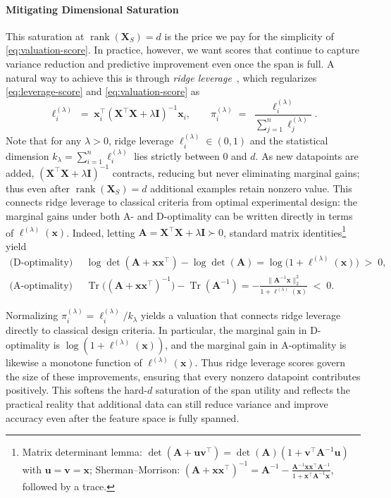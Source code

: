 \documentclass{article}
\def\amat{\mathbf{A}}
\def\xmat{\mathbf{X}}
\def\imat{\mathbf{I}}
\def\x{\mathbf{x}}
\def\uvec{\mathbf{u}}
\def\vvec{\mathbf{v}}
\newcommand{\1}{\mathbbm{1}}
\DeclareMathOperator{\Tr}{Tr}
\DeclareMathOperator{\rank}{rank}
\begin{document}
\paragraph{Mitigating Dimensional Saturation}

This saturation at $\rank(\xmat_S)=d$ is the price we pay for the simplicity of \eqref{eq:valuation-score}.
%
In practice, however, we want scores that continue to capture variance reduction and predictive improvement even once the span is full.
%
A natural way to achieve this is through \emph{ridge leverage}~\cite{cohen2015ridge}, which regularizes \eqref{eq:leverage-score} and \eqref{eq:valuation-score} as 
%
\begin{equation}
    \label{eq:ridge-leverage}
    \ell_i^{(\lambda)} \;=\; \x_i^\top (\xmat^\top \xmat + \lambda \imat)^{-1} \x_i,
    \qquad
    \pi_i^{(\lambda)} \;=\; \frac{\ell_i^{(\lambda)}}{\sum_{j=1}^n \ell_j^{(\lambda)}}.
\end{equation}
%
Note that for any $\lambda>0$, ridge leverage $\ell_i^{(\lambda)} \in (0,1)$ and the statistical dimension $k_\lambda=\sum_{i=1}^n \ell_i^{(\lambda)}$ lies strictly between $0$ and $d$.
%
As new datapoints are added, $(\xmat^\top \xmat+\lambda \imat)^{-1}$ contracts, reducing but never eliminating marginal gains; thus even after $\rank(\xmat_S)=d$ additional examples retain nonzero value.
%
This connects ridge leverage to classical criteria from optimal experimental design: the marginal gains under both A- and D-optimality can be written directly in terms of $\ell^{(\lambda)}(\x)$.
%
Indeed, letting $\amat=\xmat^\top \xmat+\lambda \imat \succ 0$, standard matrix identities\footnote{Matrix determinant lemma: $\det(\amat + \uvec \vvec^\top)=\det(\amat)(1+\vvec^\top \amat^{-1}\uvec)$ with $\uvec=\vvec=\x$; Sherman–Morrison: $(\amat+\x \x^\top)^{-1}=\amat^{-1}-\frac{\amat^{-1}\x\x^\top \amat^{-1}}{1+\x^\top \amat^{-1}\x}$, followed by a trace.} yield
\begin{align*}
    \text{(D-optimality)} \qquad & \log\det(\amat+\x \x^\top) - \log\det(\amat) = \log\!\big(1+\ell^{(\lambda)}(\x)\big) \;>\; 0,\\
    \text{(A-optimality)} \qquad & \Tr\!\big((\amat + \x\x^\top)^{-1}\big) - \Tr(\amat^{-1}) = -\frac{\|\amat^{-1}\x\|_2^2}{1+\ell^{(\lambda)}(\x)} \;<\; 0.
\end{align*}

Normalizing $\pi_i^{(\lambda)} = \ell_i^{(\lambda)}/k_\lambda$ yields a valuation that connects ridge leverage directly to classical design criteria.
%
In particular, the marginal gain in D-optimality is $\log(1+\ell^{(\lambda)}(\x))$, and the marginal gain in A-optimality is likewise a monotone function of $\ell^{(\lambda)}(\x)$.
%
Thus ridge leverage scores govern the size of these improvements, ensuring that every nonzero datapoint contributes positively.
%
This softens the hard-$d$ saturation of the span utility and reflects the practical reality that additional data can still reduce variance and improve accuracy even after the feature space is fully spanned.
\end{document}
